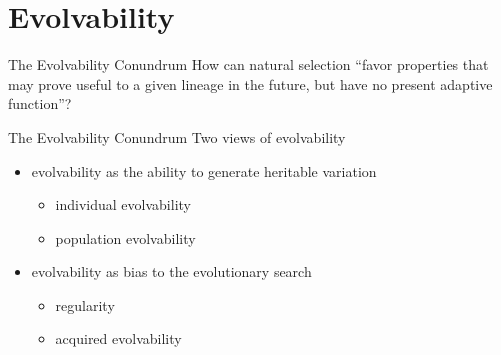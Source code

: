 \section{Evolvability}

\begin{frame}{The Evolvability Conundrum}
How can natural selection ``favor properties that may prove useful to a given lineage in the future, but have no present adaptive function''? \cite{Pigliucci2008IsEvolvable}
\end{frame}

\begin{frame}{The Evolvability Conundrum}
Two views of evolvability
\begin{itemize}
  \item evolvability as the ability to generate heritable variation
    \begin{itemize}
      \item individual evolvability
      \item population evolvability
    \end{itemize}
  \item evolvability as bias to the evolutionary search
  \begin{itemize}
    \item regularity
    \item acquired evolvability
  \end{itemize}
\end{itemize}
\end{frame}

